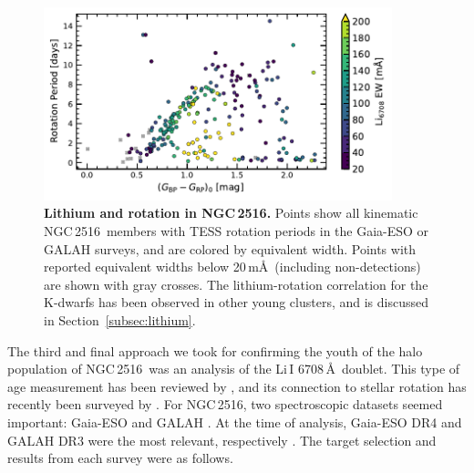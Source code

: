 \documentclass[12pt,twocolumn,tighten]{aastex63}
\newcommand{\cn}{NGC\,2516} %
\begin{document}
\begin{figure}[t]
	\begin{center}
		\leavevmode
		\includegraphics[width=0.9\textwidth]{f5b.pdf}
	\end{center}
	\vspace{-0.7cm}
  \caption{ {\bf Lithium and rotation in NGC\,2516.} Points show all
  kinematic \cn\ members with TESS rotation periods in the Gaia-ESO or
  GALAH surveys, and are colored by equivalent width.  Points with
  reported equivalent widths below 20\,m\AA\ (including
  non-detections) are shown with gray crosses.  The lithium-rotation
  correlation for the K-dwarfs has been observed in other young
  clusters, and is discussed in Section~\ref{subsec:lithium}.
	\label{fig:lithiumrot}
	}
\end{figure}

The third and final approach we took for confirming the youth of the
halo population of \cn\ was an analysis of the Li\,\textsc{I}
6708\,\AA\ doublet.  This type of age measurement has been reviewed by
\citet{soderblom_ages_2010}, and its connection to stellar rotation
has recently been surveyed by \citet{bouvier_lithium-rotation_2020}.
For \cn, two spectroscopic datasets seemed important:
Gaia-ESO \citep{gilmore_gaiaeso_2012} and GALAH
\citep{silva_galah_2015}.  At the time of analysis, Gaia-ESO DR4 and
GALAH DR3 were the most relevant, respectively \citep[{\it
e.g.},][]{randich_gaiaeso_2018,buder_galah_2020}.  The target
selection and results from each survey were as follows.
\end{document}
